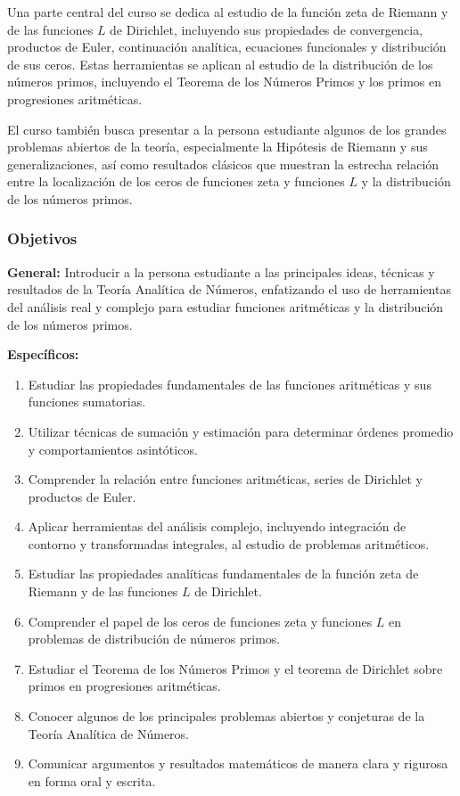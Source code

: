 \begin{refsection}
Una parte central del curso se dedica al estudio de la función zeta de Riemann y de las funciones $L$ de Dirichlet, incluyendo sus propiedades de convergencia, productos de Euler, continuación analítica, ecuaciones funcionales y distribución de sus ceros. Estas herramientas se aplican al estudio de la distribución de los números primos, incluyendo el Teorema de los Números Primos y los primos en progresiones aritméticas.

El curso también busca presentar a la persona estudiante algunos de los grandes problemas abiertos de la teoría, especialmente la Hipótesis de Riemann y sus generalizaciones, así como resultados clásicos que muestran la estrecha relación entre la localización de los ceros de funciones zeta y funciones $L$ y la distribución de los números primos.

\subsubsection*{Objetivos}

\textbf{General:} Introducir a la persona estudiante a las principales ideas, técnicas y resultados de la Teoría Analítica de Números, enfatizando el uso de herramientas del análisis real y complejo para estudiar funciones aritméticas y la distribución de los números primos. \

\textbf{Específicos:}

\begin{enumerate}
\item Estudiar las propiedades fundamentales de las funciones aritméticas y sus funciones sumatorias.
\item Utilizar técnicas de sumación y estimación para determinar órdenes promedio y comportamientos asintóticos.
\item Comprender la relación entre funciones aritméticas, series de Dirichlet y productos de Euler.
\item Aplicar herramientas del análisis complejo, incluyendo integración de contorno y transformadas integrales, al estudio de problemas aritméticos.
\item Estudiar las propiedades analíticas fundamentales de la función zeta de Riemann y de las funciones $L$ de Dirichlet.
\item Comprender el papel de los ceros de funciones zeta y funciones $L$ en problemas de distribución de números primos.
\item Estudiar el Teorema de los Números Primos y el teorema de Dirichlet sobre primos en progresiones aritméticas.
\item Conocer algunos de los principales problemas abiertos y conjeturas de la Teoría Analítica de Números.
\item Comunicar argumentos y resultados matemáticos de manera clara y rigurosa en forma oral y escrita.
\end{enumerate}


\end{refsection}
